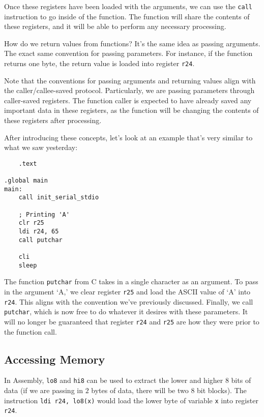 Once these registers have been loaded with the arguments, we can use the \verb!call! instruction to go inside of the function. The function will share the contents of these registers, and it will be able to perform any necessary processing. 



How do we return values from functions? It's the same idea as passing arguments. The exact same convention for passing parameters. For instance, if the function returns one byte, the return value is loaded into register \verb!r24!. 


Note that the conventions for passing arguments and returning values align with the caller/callee-saved protocol. Particularly, we are passing parameters through caller-saved registers. The function caller is expected to have already saved any important data in these registers, as the function will be changing the contents of these registers after processing.


After introducing these concepts, let's look at an example that's very similar to what we saw yesterday:


\lstset{
caption=Assembly: Arguments and Return Values
}
\begin{lstlisting}
    .text
    
.global main
main:
    call init_serial_stdio
    
    ; Printing 'A'
    clr r25
    ldi r24, 65
    call putchar
    
    cli
    sleep
\end{lstlisting}


The function \verb!putchar! from C takes in a single character as an argument. To pass in the argument `A,' we clear register \verb!r25! and load the ASCII value of `A' into \verb!r24!. This aligns with the convention we've previously discussed. Finally, we call \verb!putchar!, which is now free to do whatever it desires with these parameters. It will no longer be guaranteed that register \verb!r24! and \verb!r25! are how they were prior to the function call.



\subsection{Accessing Memory}

In Assembly, \verb!lo8! and \verb!hi8! can be used to extract the lower and higher $8$ bits of data (if we are passing in $2$ bytes of data, there will be two $8$ bit blocks). The instruction \verb!ldi r24, lo8(x)! would load the lower byte of variable \verb!x! into register \verb!r24!. 



